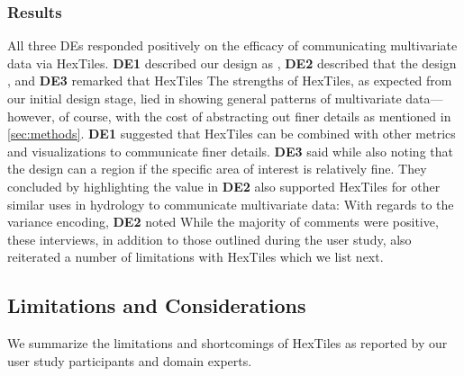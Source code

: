 
\subsubsection{Results}
All three DEs responded positively on the efficacy of communicating multivariate data via HexTiles. 
%
\textbf{DE1} described our design as , \textbf{DE2} described that the design , and \textbf{DE3} remarked that HexTiles 
%
The strengths of HexTiles, as expected from our initial design stage, lied in showing general patterns of multivariate data---however, of course, with the cost of abstracting out finer details as mentioned in \cref{sec:methods}.
%
\textbf{DE1} suggested that HexTiles can be combined with other metrics and visualizations to communicate finer details.
%
\textbf{DE3} said  while also noting that the design can  a region if the specific area of interest is
relatively fine.
%
They concluded by highlighting the value in 
%
\textbf{DE2} also supported HexTiles for other similar uses in hydrology to communicate multivariate data:  
%
With regards to the variance encoding, \textbf{DE2} noted 
%
While the majority of comments were positive,  these interviews, in addition to those outlined during the user study, also reiterated a number of limitations with HexTiles which we list next.

\subsection{Limitations and Considerations}
We summarize the limitations and shortcomings of HexTiles as reported by our user study participants and domain experts.

